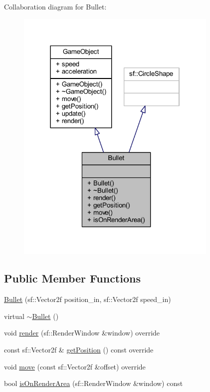 Collaboration diagram for Bullet\+:\nopagebreak
\begin{figure}[H]
\begin{center}
\leavevmode
\includegraphics[width=274pt]{class_bullet__coll__graph}
\end{center}
\end{figure}
\subsection*{Public Member Functions}
\begin{DoxyCompactItemize}
\item 
\hyperlink{class_bullet_ab785558b82bce3c860a9d0f63aff2f41}{Bullet} (sf\+::\+Vector2f position\+\_\+in, sf\+::\+Vector2f speed\+\_\+in)
\item 
virtual \hyperlink{class_bullet_aaeb5cb41d7db89f49007b08b41f1bfcf}{$\sim$\+Bullet} ()
\item 
void \hyperlink{class_bullet_ae4af350647e1b2a798eb3fd35a883b84}{render} (sf\+::\+Render\+Window \&window) override
\item 
const sf\+::\+Vector2f \& \hyperlink{class_bullet_a405c853cbdaffd53d506eb3ee474a3ef}{get\+Position} () const override
\item 
void \hyperlink{class_bullet_a8715ab2edff76c8b45fabc6dc453e85d}{move} (const sf\+::\+Vector2f \&offset) override
\item 
bool \hyperlink{class_bullet_adb7fd96160370770ac03e05cb8aeee42}{is\+On\+Render\+Area} (sf\+::\+Render\+Window \&window) const 
\end{DoxyCompactItemize}
